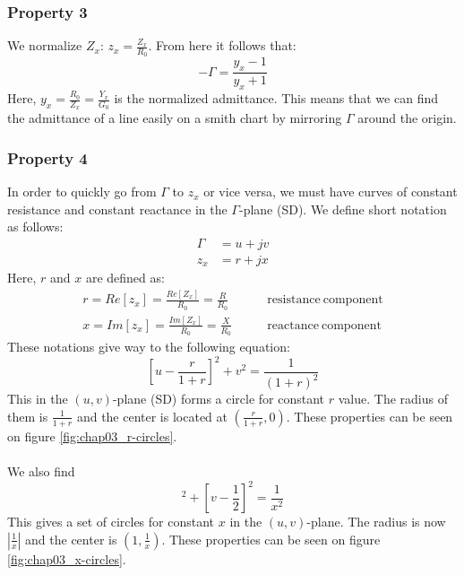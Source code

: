 \documentclass[../transmission.tex]{subfiles}
\begin{document}
			\subsubsection{Property 3}
				We normalize $Z_x$: $z_x = \frac{Z_x}{R_0}$. From here it follows that:
				\begin{equation}
					-\Gamma=\frac{y_x-1}{y_x+1}
				\end{equation}
				Here, $y_x = \frac{R_0}{Z_x} = \frac{Y_x}{G_0}$ is the normalized admittance. This means that we can find the admittance of a line easily on a smith chart by mirroring $\Gamma$ around the origin.
				
			\subsubsection{Property 4}
				In order to quickly go from $\Gamma$ to $z_x$ or vice versa, we must have curves of constant resistance and constant reactance in the $\Gamma$-plane (SD). We define short notation as follows:
				\begin{align}
					\Gamma &= u+jv\\
					z_x&=r+jx
				\end{align}
				Here, $r$ and $x$ are defined as:
				\begin{align}
					r=Re[z_x]=\frac{Re[Z_x]}{R_0}=\frac{R}{R_0}&\qquad\mathrm{resistance\ component}\\
					x=Im[z_x]=\frac{Im[Z_x]}{R_0}=\frac{X}{R_0}&\qquad\mathrm{reactance\ component}
				\end{align}
				These notations give way to the following equation:
				\begin{equation}
					\left[u-\frac{r}{1+r}\right]^2+v^2=\frac{1}{(1+r)^2} 
				\end{equation}
				This in the $(u,v)$-plane (SD) forms a circle for constant $r$ value. The radius of them is $\frac{1}{1+r}$ and the center is located at $\left(\frac{r}{1+r},0\right)$. These properties can be seen on figure \ref{fig:chap03_r-circles}.\\
				\\
				We also find 
				\begin{equation}
					[u-1]^2+\left[v-\frac{1}{2}\right]^2=\frac{1}{x^2}
				\end{equation}
				This gives a set of circles for constant $x$ in the $(u,v)$-plane. The radius is now $\left|\frac{1}{x}\right|$ and the center is $\left(1,\frac{1}{x}\right)$. These properties can be seen on figure \ref{fig:chap03_x-circles}.
\end{document}

